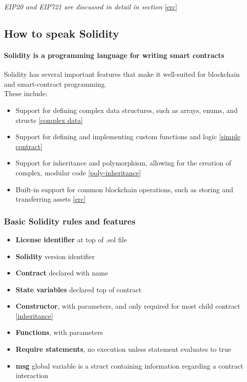 \documentclass{article}
\theoremstyle{theorem}
\theoremstyle{definition}
\theoremstyle{remark}
\begin{document}
\medskip\noindent
\textit{EIP20 and EIP721 are discussed in detail in section} \ref{erc}


\subsection{How to speak Solidity}

\paragraph{Solidity is a programming language for writing smart contracts}Solidity has several important features that make it well-suited for blockchain and smart-contract programming. \\These include:

\begin{itemize}
\item Support for defining complex data structures, such as arrays, enums, and structs \ref{complex data}
\item Support for defining and implementing custom functions and logic \ref{simple contract}
\item Support for inheritance and polymorphism, allowing for the creation of complex, modular code \ref{poly-inheritance}
\item Built-in support for common blockchain operations, such as storing and transferring assets \ref{erc}
\end{itemize}

\subsubsection{Basic Solidity rules and features}\label{core aspects}

\begin{itemize}
    \item {\bf License identifier} at top of .sol file
    \item {\bf Solidity} version identifier
    \item {\bf Contract} declared with name
    \item {\bf State variables} declared top of contract
    \item {\bf Constructor}, with parameters, and only required for most child contract \ref{inheritance}
    \item {\bf Functions}, with parameters
    \item {\bf Require statements}, no execution unless statement evaluates to true 
    \item {\bf msg} global variable is a struct containing information regarding a contract interaction 
\end{itemize}
\end{document}
